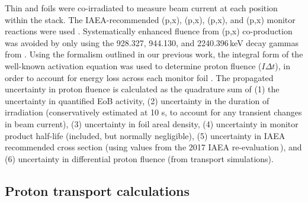 Thin  and  foils  
were co-irradiated to measure beam current at each position within the stack.
The IAEA-recommended (p,x), (p,x),  (p,x), and (p,x) monitor reactions were used 
\cite{Hermanne2018}.
Systematically enhanced fluence from (p,x) co-production was avoided by only using the 928.327, 944.130, and 2240.396\,keV decay gammas  from .
Using the formalism outlined in our previous work, the integral form of the well-known activation equation was used to  determine proton fluence ($I \Delta t $),
in order to account for energy loss across each monitor foil \cite{Voyles2018a}.
The propagated uncertainty in proton fluence is calculated as the quadrature sum of (1) the uncertainty in quantified EoB activity, (2) uncertainty in the duration of irradiation (conservatively estimated at 10 s, to account for any transient changes in beam current), (3) uncertainty in foil areal density, (4) uncertainty in monitor product half-life (included, but normally negligible), (5) uncertainty in IAEA recommended cross section (using values  from the 2017 IAEA re-evaluation\,\cite{Hermanne2018}), and (6) uncertainty in differential proton fluence (from transport simulations).






\subsection{\label{sec:proton_transport_fe}Proton transport calculations}

